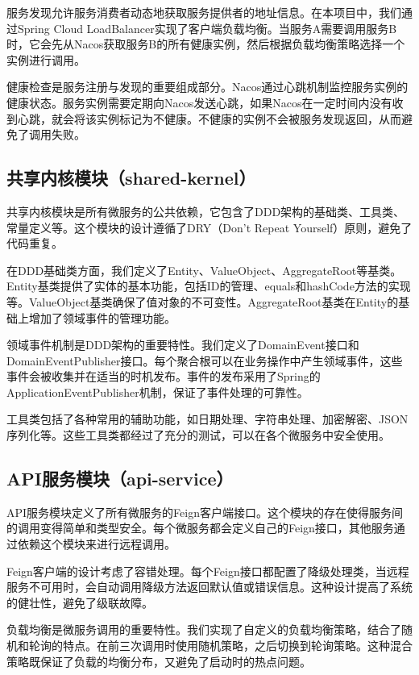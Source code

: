 \documentclass[a4paper,12pt]{article}
\begin{document}
服务发现允许服务消费者动态地获取服务提供者的地址信息。在本项目中，我们通过Spring Cloud LoadBalancer实现了客户端负载均衡。当服务A需要调用服务B时，它会先从Nacos获取服务B的所有健康实例，然后根据负载均衡策略选择一个实例进行调用。

健康检查是服务注册与发现的重要组成部分。Nacos通过心跳机制监控服务实例的健康状态。服务实例需要定期向Nacos发送心跳，如果Nacos在一定时间内没有收到心跳，就会将该实例标记为不健康。不健康的实例不会被服务发现返回，从而避免了调用失败。

\subsection{共享内核模块（shared-kernel）}

共享内核模块是所有微服务的公共依赖，它包含了DDD架构的基础类、工具类、常量定义等。这个模块的设计遵循了DRY（Don't Repeat Yourself）原则，避免了代码重复。

在DDD基础类方面，我们定义了Entity、ValueObject、AggregateRoot等基类。Entity基类提供了实体的基本功能，包括ID的管理、equals和hashCode方法的实现等。ValueObject基类确保了值对象的不可变性。AggregateRoot基类在Entity的基础上增加了领域事件的管理功能。

领域事件机制是DDD架构的重要特性。我们定义了DomainEvent接口和DomainEventPublisher接口。每个聚合根可以在业务操作中产生领域事件，这些事件会被收集并在适当的时机发布。事件的发布采用了Spring的ApplicationEventPublisher机制，保证了事件处理的可靠性。

工具类包括了各种常用的辅助功能，如日期处理、字符串处理、加密解密、JSON序列化等。这些工具类都经过了充分的测试，可以在各个微服务中安全使用。

\subsection{API服务模块（api-service）}

API服务模块定义了所有微服务的Feign客户端接口。这个模块的存在使得服务间的调用变得简单和类型安全。每个微服务都会定义自己的Feign接口，其他服务通过依赖这个模块来进行远程调用。

Feign客户端的设计考虑了容错处理。每个Feign接口都配置了降级处理类，当远程服务不可用时，会自动调用降级方法返回默认值或错误信息。这种设计提高了系统的健壮性，避免了级联故障。

负载均衡是微服务调用的重要特性。我们实现了自定义的负载均衡策略，结合了随机和轮询的特点。在前三次调用时使用随机策略，之后切换到轮询策略。这种混合策略既保证了负载的均衡分布，又避免了启动时的热点问题。
\end{document}
